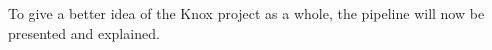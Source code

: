To give a better idea of the Knox project as a whole, the pipeline will now be presented and explained. 






